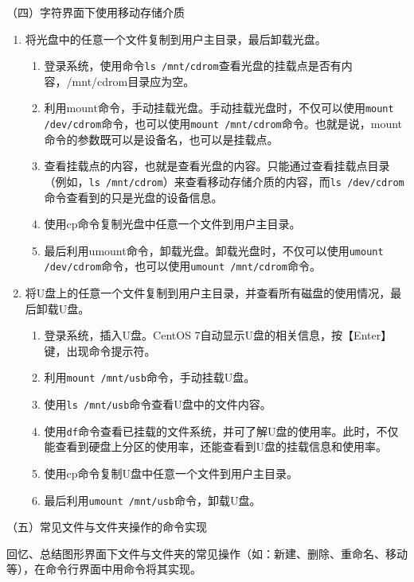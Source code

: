 \vspace{0.1in}
（四）字符界面下使用移动存储介质
\begin{enumerate}
  \item 将光盘中的任意一个文件复制到用户主目录，最后卸载光盘。
    \begin{enumerate}
      \item 登录系统，使用命令\verb|ls /mnt/cdrom|查看光盘的挂载点是否有内容，/mnt/cdrom目录应为空。
      \item 利用mount命令，手动挂载光盘。手动挂载光盘时，不仅可以使用\verb|mount /dev/cdrom|命令，也可以使用\verb|mount /mnt/cdrom|命令。也就是说，mount命令的参数既可以是设备名，也可以是挂载点。
      \item 查看挂载点的内容，也就是查看光盘的内容。只能通过查看挂载点目录（例如，\verb|ls /mnt/cdrom|）来查看移动存储介质的内容，而\verb|ls /dev/cdrom|命令查看到的只是光盘的设备信息。
      \item 使用cp命令复制光盘中任意一个文件到用户主目录。
      \item 最后利用umount命令，卸载光盘。卸载光盘时，不仅可以使用\verb|umount /dev/cdrom|命令，也可以使用\verb|umount /mnt/cdrom|命令。
    \end{enumerate}
  \item 将U盘上的任意一个文件复制到用户主目录，并查看所有磁盘的使用情况，最后卸载U盘。
    \begin{enumerate}
      \item 登录系统，插入U盘。CentOS 7自动显示U盘的相关信息，按【Enter】键，出现命令提示符。
      \item 利用\verb|mount /mnt/usb|命令，手动挂载U盘。
      \item 使用\verb|ls /mnt/usb|命令查看U盘中的文件内容。
      \item 使用\verb|df|命令查看已挂载的文件系统，并可了解U盘的使用率。此时，不仅能查看到硬盘上分区的使用率，还能查看到U盘的挂载信息和使用率。
      \item 使用cp命令复制U盘中任意一个文件到用户主目录。
      \item 最后利用\verb|umount /mnt/usb|命令，卸载U盘。
    \end{enumerate}
\end{enumerate}

\vspace{0.1in}
（五）常见文件与文件夹操作的命令实现

回忆、总结图形界面下文件与文件夹的常见操作（如：新建、删除、重命名、移动等），在命令行界面中用命令将其实现。
